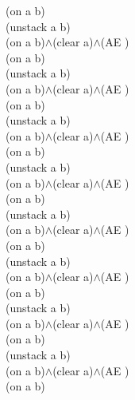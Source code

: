 {{(on a b)\\
(unstack a b)\\
(on a b)$\wedge$(clear a)$\wedge$(AE )\\
(on a b)\\
(unstack a b)\\
(on a b)$\wedge$(clear a)$\wedge$(AE )\\
(on a b)\\
(unstack a b)\\
(on a b)$\wedge$(clear a)$\wedge$(AE )\\
(on a b)\\
(unstack a b)\\
(on a b)$\wedge$(clear a)$\wedge$(AE )\\
(on a b)\\
(unstack a b)\\
(on a b)$\wedge$(clear a)$\wedge$(AE )\\
(on a b)\\
(unstack a b)\\
(on a b)$\wedge$(clear a)$\wedge$(AE )\\
(on a b)\\
(unstack a b)\\
(on a b)$\wedge$(clear a)$\wedge$(AE )\\
(on a b)\\
(unstack a b)\\
(on a b)$\wedge$(clear a)$\wedge$(AE )\\
(on a b)\\
}%
}

